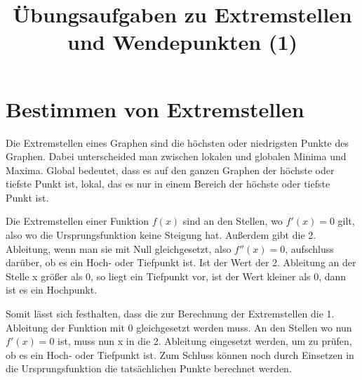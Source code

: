 \documentclass[10pt,a4paper]{article}
\begin{document}
	
\title{Übungsaufgaben zu Extremstellen und Wendepunkten (1)}

\makeatletter
\def\@maketitle{%
  \newpage
  \null
  \vskip 2em%
  \begin{center}%
	\let \footnote \thanks
    {\Huge\bfseries\@title \par}%
    \vskip 1.5em%
    {\large
	\lineskip .5em%
	\begin{tabular}[t]{c}%
        \@author
      \end{tabular}\par}%
    \vskip 1em%
    {\large \@date}%
  \end{center}%
  \par
  \vskip 1.5em}
\makeatother

\author{}
\date{}

\maketitle

\section*{Bestimmen von Extremstellen}
Die Extremstellen eines Graphen sind die höchsten oder niedrigsten Punkte des Graphen.
Dabei unterscheided man zwischen lokalen und globalen Minima und Maxima. Global bedeutet,
dass es auf den ganzen Graphen der höchste oder tiefste Punkt ist, lokal, das es nur in einem Bereich
der höchste oder tiefste Punkt ist.
\newline

Die Extremstellen einer Funktion $f(x)$ sind an den Stellen, wo $f'(x) = 0$ gilt, also wo
die Ursprungsfunktion keine Steigung hat. Außerdem gibt die 2. Ableitung, wenn man sie mit Null
gleichgesetzt, also $f''(x) = 0$, aufschluss darüber, ob es ein Hoch- oder Tiefpunkt ist.
Ist der Wert der 2. Ableitung an der Stelle x größer als $0$, so liegt ein Tiefpunkt vor, ist der Wert kleiner
als $0$, dann ist es ein Hochpunkt.
\newline

Somit lässt sich festhalten, dass die zur Berechnung der Extremstellen die 1. Ableitung der Funktion
mit $0$ gleichgesetzt werden muss. An den Stellen wo nun $f'(x) = 0$ ist, muss nun x in die 2. Ableitung
eingesetzt werden, um zu prüfen, ob es ein Hoch- oder Tiefpunkt ist.
Zum Schluss können noch durch Einsetzen in die Ursprungsfunktion die tatsächlichen Punkte
berechnet werden.
\newline
\end{document}
